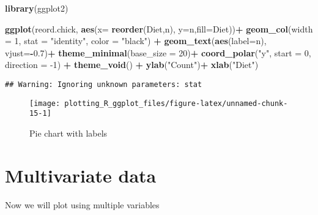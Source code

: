\documentclass[
]{book}
\newenvironment{Shaded}{\begin{snugshade}}{\end{snugshade}}
\newcommand{\DataTypeTok}[1]{\textcolor[rgb]{0.13,0.29,0.53}{#1}}
\newcommand{\DecValTok}[1]{\textcolor[rgb]{0.00,0.00,0.81}{#1}}
\newcommand{\FloatTok}[1]{\textcolor[rgb]{0.00,0.00,0.81}{#1}}
\newcommand{\KeywordTok}[1]{\textcolor[rgb]{0.13,0.29,0.53}{\textbf{#1}}}
\newcommand{\NormalTok}[1]{#1}
\newcommand{\OperatorTok}[1]{\textcolor[rgb]{0.81,0.36,0.00}{\textbf{#1}}}
\newcommand{\StringTok}[1]{\textcolor[rgb]{0.31,0.60,0.02}{#1}}
\begin{document}
\begin{Shaded}
\begin{Highlighting}[]
\KeywordTok{library}\NormalTok{(ggplot2)}

\KeywordTok{ggplot}\NormalTok{(reord.chick, }\KeywordTok{aes}\NormalTok{(}\DataTypeTok{x=} \KeywordTok{reorder}\NormalTok{(Diet,n), }\DataTypeTok{y=}\NormalTok{n,}\DataTypeTok{fill=}\NormalTok{Diet))}\OperatorTok{+}
\StringTok{  }\KeywordTok{geom_col}\NormalTok{(}\DataTypeTok{width =} \DecValTok{1}\NormalTok{, }
           \DataTypeTok{stat =} \StringTok{"identity"}\NormalTok{, }
           \DataTypeTok{color =} \StringTok{"black"}\NormalTok{) }\OperatorTok{+}
\StringTok{  }\KeywordTok{geom_text}\NormalTok{(}\KeywordTok{aes}\NormalTok{(}\DataTypeTok{label=}\NormalTok{n), }\DataTypeTok{vjust=}\OperatorTok{-}\FloatTok{0.7}\NormalTok{)}\OperatorTok{+}
\StringTok{  }\KeywordTok{theme_minimal}\NormalTok{(}\DataTypeTok{base_size =} \DecValTok{20}\NormalTok{)}\OperatorTok{+}
\StringTok{  }\KeywordTok{coord_polar}\NormalTok{(}\StringTok{"y"}\NormalTok{, }
              \DataTypeTok{start =} \DecValTok{0}\NormalTok{, }
              \DataTypeTok{direction =} \DecValTok{-1}\NormalTok{) }\OperatorTok{+}
\StringTok{  }\KeywordTok{theme_void}\NormalTok{() }\OperatorTok{+}
\StringTok{  }\KeywordTok{ylab}\NormalTok{(}\StringTok{"Count"}\NormalTok{)}\OperatorTok{+}\StringTok{ }\KeywordTok{xlab}\NormalTok{(}\StringTok{"Diet"}\NormalTok{)}
\end{Highlighting}
\end{Shaded}

\begin{verbatim}
## Warning: Ignoring unknown parameters: stat
\end{verbatim}

\begin{figure}

{\centering \texttt{[image: plotting\_R\_ggplot\_files/figure-latex/unnamed-chunk-15-1]} 

}

\caption{Pie chart with labels }\label{fig:unnamed-chunk-15}
\end{figure}

\hypertarget{multivariate-data}{%
\chapter{Multivariate data}\label{multivariate-data}}

Now we will plot using multiple variables
\end{document}
